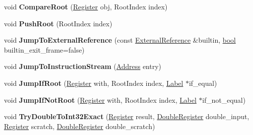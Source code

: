 \begin{DoxyCompactItemize}
\item 
\mbox{\label{classv8_1_1internal_1_1MacroAssembler_a3642eebbecf811ee033559ce6556ef25}} 
void {\bfseries Compare\+Root} (\mbox{\hyperlink{classv8_1_1internal_1_1Register}{Register}} obj, Root\+Index index)
\item 
\mbox{\label{classv8_1_1internal_1_1MacroAssembler_a91239e2f90525c993ce4dacef2b8219c}} 
void {\bfseries Push\+Root} (Root\+Index index)
\item 
\mbox{\label{classv8_1_1internal_1_1MacroAssembler_a83aa1bd635235afda8a1e96390da9227}} 
void {\bfseries Jump\+To\+External\+Reference} (const \mbox{\hyperlink{classv8_1_1internal_1_1ExternalReference}{External\+Reference}} \&builtin, \mbox{\hyperlink{classbool}{bool}} builtin\+\_\+exit\+\_\+frame=false)
\item 
\mbox{\label{classv8_1_1internal_1_1MacroAssembler_a18fc118dd1ecc3b59755acce49880671}} 
void {\bfseries Jump\+To\+Instruction\+Stream} (\mbox{\hyperlink{classuintptr__t}{Address}} entry)
\item 
\mbox{\label{classv8_1_1internal_1_1MacroAssembler_a026e7752dc80a8ac2c86242c713de128}} 
void {\bfseries Jump\+If\+Root} (\mbox{\hyperlink{classv8_1_1internal_1_1Register}{Register}} with, Root\+Index index, \mbox{\hyperlink{classv8_1_1internal_1_1Label}{Label}} $\ast$if\+\_\+equal)
\item 
\mbox{\label{classv8_1_1internal_1_1MacroAssembler_a2c433ea6b27ac33ad2b6ef6b1a751eb9}} 
void {\bfseries Jump\+If\+Not\+Root} (\mbox{\hyperlink{classv8_1_1internal_1_1Register}{Register}} with, Root\+Index index, \mbox{\hyperlink{classv8_1_1internal_1_1Label}{Label}} $\ast$if\+\_\+not\+\_\+equal)
\item 
\mbox{\label{classv8_1_1internal_1_1MacroAssembler_aa394f8b7b9f54b3a1638eedf20eb013a}} 
void {\bfseries Try\+Double\+To\+Int32\+Exact} (\mbox{\hyperlink{classv8_1_1internal_1_1Register}{Register}} result, \mbox{\hyperlink{classv8_1_1internal_1_1DoubleRegister}{Double\+Register}} double\+\_\+input, \mbox{\hyperlink{classv8_1_1internal_1_1Register}{Register}} scratch, \mbox{\hyperlink{classv8_1_1internal_1_1DoubleRegister}{Double\+Register}} double\+\_\+scratch)

\end{DoxyCompactItemize}
